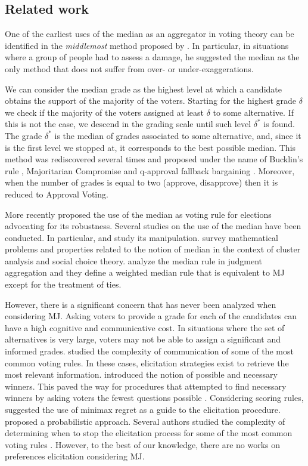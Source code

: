 \subsection{Related work}

One of the earliest uses of the median as an aggregator in voting theory can be identified in the \textit{middlemost} method proposed by \citet{Galton1907a,Galton1907b}. In particular, in situations where a group of people had to assess a damage, he suggested the median as the only method that does not suffer from over- or under-exaggerations.

We can consider the median grade as the highest level at which a candidate obtains the support of the majority of the voters. Starting for the highest grade $\delta$ we check if the majority of the voters assigned at least $\delta$ to some alternative. If this is not the case, we descend in the grading scale until such level $\delta^*$ is found. The grade $\delta^*$ is the median of grades associated to some alternative, and, since it is the first level we stopped at, it corresponds to the best possible median. This method was rediscovered several times and proposed under the name of Bucklin's rule \citep{Hoag1926}, Majoritarian Compromise \citep{Sertel1986,Sertel1999} and q-approval fallback bargaining \citep{Brams2001}. Moreover, when the number of grades is equal to two (approve, disapprove) then it is reduced to Approval Voting.

More recently \citet{Bassett1999} proposed the use of the median as voting rule for elections advocating for its robustness.
Several studies on the use of the median have been conducted. In particular, \citet{Bassett1994} and \citet{Gehrlein2003} study its manipulation. \citet{Barthelemy1981} survey mathematical problems and properties related to the notion of median in the context of cluster analysis and social choice theory. \cite{Nehring2022} analyze the median rule in judgment aggregation and they define a weighted median rule that is equivalent to \acs{MJ} except for the treatment of ties.

However, there is a significant concern that has never been analyzed when considering \ac{MJ}. Asking voters to provide a grade for each of the candidates can have a high cognitive and communicative cost. In situations where the set of alternatives is very large, voters may not be able to assign a significant and informed grades. \citet{Conitzer2005} studied the complexity of communication of some of the most common voting rules.
In these cases, elicitation strategies exist to retrieve the most relevant information. \citet{Konczak05} introduced the notion of possible and necessary winners. This paved the way for procedures that attempted to find necessary winners by asking voters the fewest questions possible \citep{Kalech2011}.
Considering scoring rules, \citet{Lu2011} suggested the use of minimax regret as a guide to the elicitation procedure. \citet{Bachrach2010} proposed a probabilistic approach. Several authors studied the complexity of determining when to stop the elicitation process for some of the most common voting rules \citep{Conitzer2002, Walsh2009}.
However, to the best of our knowledge, there are no works on preferences elicitation considering \ac{MJ}.

